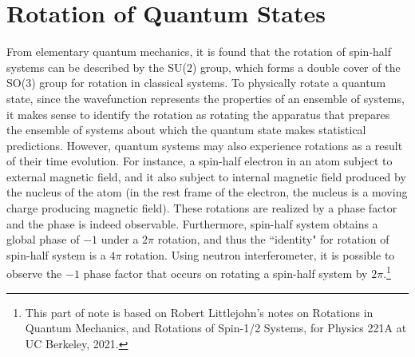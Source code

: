 \documentclass[11pt, onesided]{book}
\theoremstyle{break}
\theoremstyle{break}
\begin{document}
\section{Rotation of Quantum States}
From elementary quantum mechanics, it is found that the rotation of spin-half systems can be described by the SU($2$) group, which forms a double cover of the SO($3$) group for rotation in classical systems. To physically rotate a quantum state, since the wavefunction represents the properties of an ensemble of systems, it makes sense to identify the rotation as rotating the apparatus that prepares the ensemble of systems about which the quantum state makes statistical predictions. However, quantum systems may also experience rotations as a result of their time evolution. For instance, a spin-half electron in an atom subject to external magnetic field, and it also subject to internal magnetic field produced by the nucleus of the atom (in the rest frame of the electron, the nucleus is a moving charge producing magnetic field). These rotations are realized by a phase factor and the phase is indeed observable. Furthermore, spin-half system obtains a global phase of $-1$ under a $2\pi$ rotation, and thus the ``identity" for rotation of spin-half system is a $4\pi$ rotation. Using neutron interferometer, it is possible to observe the $-1$ phase factor that occurs on rotating a spin-half system by $2\pi$.\footnote{This part of note is based on Robert Littlejohn's notes on Rotations in Quantum Mechanics, and Rotations of Spin-1/2 Systems, for Physics 221A at UC Berkeley, 2021.} \\
\end{document}
